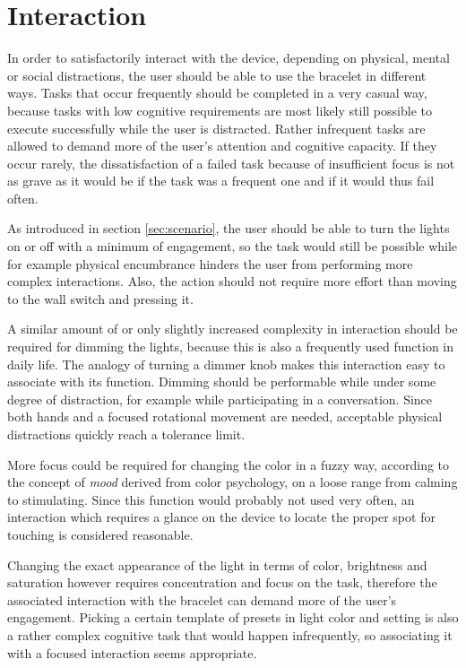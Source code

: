 \chapter{Interaction}
\label{sec:interaction}
In order to satisfactorily interact with the device, depending on physical, mental or social distractions, the user should be able to use the bracelet in different ways. Tasks that occur frequently should be completed in a very casual way, because tasks with low cognitive requirements are most likely still possible to execute successfully while the user is distracted. Rather infrequent tasks are allowed to demand more of the user's attention and cognitive capacity. If they occur rarely, the dissatisfaction of a failed task because of insufficient focus is not as grave as it would be if the task was a frequent one and if it would thus fail often.

As introduced in section \ref{sec:scenario}, the user should be able to turn the lights on or off with a minimum of engagement, so the task would still be possible while for example physical encumbrance hinders the user from performing more complex interactions. Also, the action should not require more effort than moving to the wall switch and pressing it. 

A similar amount of or only slightly increased complexity in interaction should be required for dimming the lights, because this is also a frequently used function in daily life. The analogy of turning a dimmer knob makes this interaction easy to associate with its function. Dimming should be performable while under some degree of distraction, for example while participating in a conversation. Since both hands and a focused rotational movement are needed, acceptable physical distractions quickly reach a tolerance limit.

More focus could be required for changing the color in a fuzzy way, according to the concept of \textit{mood} derived from color psychology, on a loose range from calming to stimulating. Since this function would probably not used very often, an interaction which requires a glance on the device to locate the proper spot for touching is considered reasonable. 

Changing the exact appearance of the light in terms of color, brightness and saturation however requires concentration and focus on the task, therefore the associated interaction with the bracelet can demand more of the user's engagement. Picking a certain template of presets in light color and setting is also a rather complex cognitive task that would happen infrequently, so associating it with a focused interaction seems appropriate.

